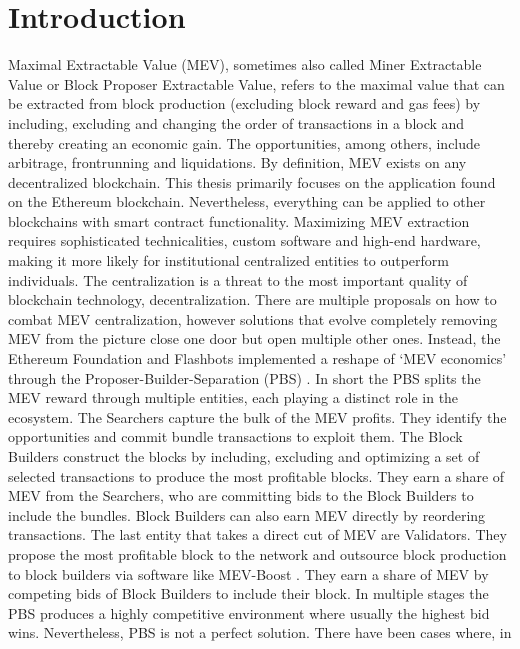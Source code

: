 \chapter{Introduction}
Maximal Extractable Value (MEV), sometimes also called Miner Extractable
Value or Block Proposer Extractable Value, refers to the maximal value that
can be extracted from block production (excluding block reward and gas fees)
by including, excluding and changing the order of transactions in a block and
thereby creating an economic gain. The opportunities, among others, include
arbitrage, frontrunning and liquidations. By definition, MEV exists on any
decentralized blockchain. This thesis primarily focuses on the
application found on the Ethereum blockchain. Nevertheless, everything can be
applied to other blockchains with smart contract functionality. Maximizing
MEV extraction requires sophisticated technicalities, custom software and
high-end hardware, making it more likely for institutional centralized
entities to outperform individuals. The centralization is a threat to the
most important quality of blockchain technology, decentralization. There are
multiple proposals on how to combat MEV centralization, however solutions that
evolve completely removing MEV from the picture close one door but open
multiple other ones.
\newline
Instead, the Ethereum Foundation \cite{ethereum_foundation} and Flashbots
\cite{flashbots} implemented a reshape of `MEV economics' through the
Proposer-Builder-Separation (PBS) \cite{proposer_builder_sep}. In short the
PBS splits the MEV reward through multiple entities, each playing a distinct
role in the ecosystem. The Searchers capture the bulk of the MEV profits.
They identify the opportunities and commit bundle transactions to exploit
them. The Block Builders construct the blocks by including, excluding and
optimizing a set of selected transactions to produce the most profitable
blocks. They earn a share of MEV from the Searchers, who are committing bids
to the Block Builders to include the bundles. Block Builders can also earn
MEV directly by reordering transactions. The last entity that takes a direct
cut of MEV are Validators. They propose the most profitable block to the
network and outsource block production to block builders via software like
MEV-Boost \cite{flashbots}. They earn a share of MEV by competing bids of
Block Builders to include their block. In multiple stages the PBS produces a
highly competitive environment where usually the highest bid wins.
Nevertheless, PBS is not a perfect solution. There have been cases where, in
